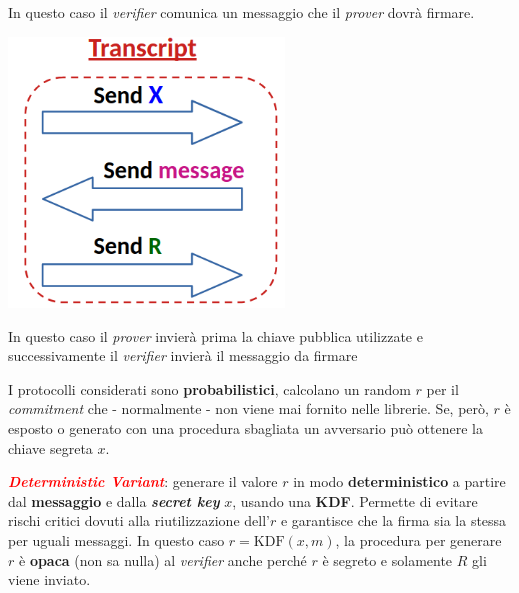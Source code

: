 \begin{flushleft}
{\begin{minipage}[t]{0.45\textwidth}
            \begin{flushleft}
                In questo caso il \textit{verifier} comunica un messaggio che il \textit{prover} dovrà firmare.
            \end{flushleft}

        \end{minipage}
        \hfill
        \begin{minipage}[t]{0.45\textwidth}
            \centering
            \includegraphics[width=0.55\textwidth]{img/schnorr_mX_ip.png}

            \begin{flushleft}
                In questo caso il \textit{prover} invierà prima la chiave pubblica utilizzate e successivamente il \textit{verifier} invierà il messaggio da firmare
            \end{flushleft}
        \end{minipage}
    \par}
    
    I protocolli considerati sono \textbf{probabilistici}, calcolano un random $r$ per il \textit{commitment} che - normalmente - non viene mai fornito nelle librerie. Se, però, $r$ è esposto o generato con una procedura sbagliata un avversario può ottenere la chiave segreta $x$.
    
    \smallskip

    \textcolor{red}{\textbf{\textit{Deterministic Variant}}}: generare il valore $r$ in modo \textbf{deterministico} a partire dal \textbf{messaggio} e dalla \textbf{\textit{secret key}} $x$, usando una \textbf{KDF}. Permette di evitare rischi critici dovuti alla riutilizzazione dell'$r$ e garantisce che la firma sia la stessa per uguali messaggi.
    In questo caso $r = \text{KDF}(x, m)$, la procedura per generare $r$ è \textbf{opaca} (non sa nulla) al \textit{verifier} anche perché $r$ è segreto e solamente $R$ gli viene inviato.


\end{flushleft}
